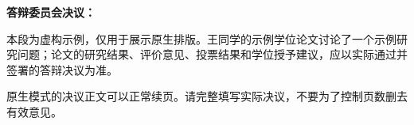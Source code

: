 \begin{resolutiontext}
\begin{hitcommittee}
\end{hitcommittee}

\noindent\textbf{答辩委员会决议：}

本段为虚构示例，仅用于展示原生排版。王同学的示例学位论文讨论了一个示例研究问题；论文的研究结果、评价意见、投票结果和学位授予建议，应以实际通过并签署的答辩决议为准。

原生模式的决议正文可以正常续页。请完整填写实际决议，不要为了控制页数删去有效意见。
\end{resolutiontext}
